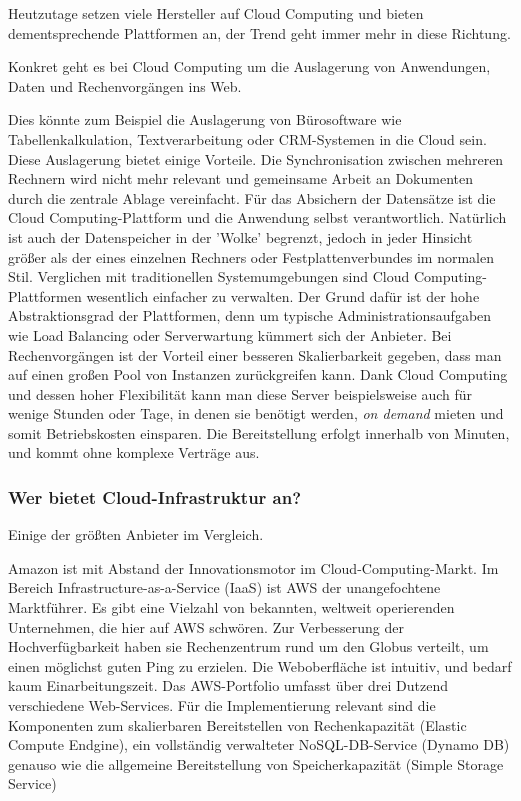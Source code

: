 \documentclass[letterpaper, 12pt]{article}
\let\tempsubsubsection\subsubsection
\renewcommand\subsubsection[1]{\vspace{0cm}\tempsubsubsection{#1}\vspace{0cm}}
\begin{document}
Heutzutage setzen viele Hersteller auf Cloud Computing und bieten dementsprechende Plattformen an, der Trend geht immer mehr in diese Richtung. \begin{center}
Konkret geht es bei Cloud Computing um die Auslagerung von Anwendungen, Daten und Rechenvorgängen ins Web. \\
\end{center} 
Dies könnte zum Beispiel die Auslagerung von Bürosoftware wie Tabellenkalkulation, Textverarbeitung oder CRM-Systemen in die Cloud sein.
Diese Auslagerung bietet einige Vorteile. Die Synchronisation zwischen mehreren Rechnern wird nicht mehr relevant und gemeinsame Arbeit an Dokumenten durch die zentrale Ablage vereinfacht. Für das Absichern der Datensätze ist die Cloud Computing-Plattform und die Anwendung selbst verantwortlich. Natürlich ist auch der Datenspeicher in der 'Wolke' begrenzt, jedoch in jeder Hinsicht größer als der eines einzelnen Rechners oder Festplattenverbundes im normalen Stil. Verglichen mit traditionellen Systemumgebungen sind Cloud Computing-Plattformen wesentlich einfacher zu verwalten. Der Grund dafür ist der hohe Abstraktionsgrad der Plattformen, denn um typische Administrationsaufgaben wie Load Balancing oder Serverwartung kümmert sich der Anbieter. Bei Rechenvorgängen ist der Vorteil einer besseren Skalierbarkeit gegeben, dass man auf einen großen Pool von Instanzen zurückgreifen kann. Dank Cloud Computing und dessen hoher Flexibilität kann man diese Server beispielsweise auch für wenige Stunden oder Tage, in denen sie benötigt werden, \textit{on demand} mieten und somit Betriebskosten einsparen. Die Bereitstellung erfolgt innerhalb von Minuten, und kommt ohne komplexe Verträge aus.\cite{ausarbeitungcc}

\subsubsection{Wer bietet Cloud-Infrastruktur an?}

Einige der größten Anbieter im Vergleich.


Amazon ist mit Abstand der Innovationsmotor im Cloud-Computing-Markt. Im Bereich Infrastructure-as-a-Service (IaaS) ist AWS der unangefochtene Marktführer. Es gibt eine Vielzahl von bekannten, weltweit operierenden Unternehmen, die hier auf AWS schwören. Zur Verbesserung der Hochverfügbarkeit haben sie Rechenzentrum rund um den Globus verteilt, um einen möglichst guten Ping zu erzielen. Die Weboberfläche ist intuitiv, und bedarf kaum Einarbeitungszeit. Das AWS-Portfolio umfasst über drei Dutzend verschiedene Web-Services. Für die Implementierung relevant sind die Komponenten zum skalierbaren Bereitstellen von Rechenkapazität (Elastic Compute Endgine), ein vollständig verwalteter NoSQL-DB-Service (Dynamo DB) genauso wie die allgemeine Bereitstellung von Speicherkapazität (Simple Storage Service)
\end{document}
